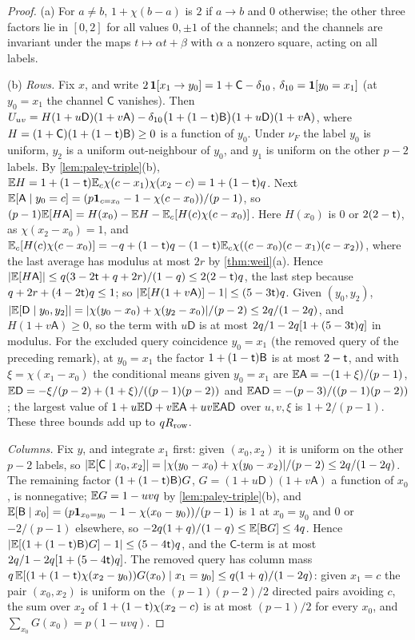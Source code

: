 \begin{proof}
(a) For $a\ne b$, $1+\chi(b-a)$ is $2$ if $a\to b$ and $0$ otherwise; the other
three factors lie in $[0,2]$ for all values $0,\pm1$ of the channels; and the
channels are invariant under the maps $t\mapsto\alpha t+\beta$ with $\alpha$ a
nonzero square, acting on all labels.

(b) \emph{Rows.} Fix $x$, and write $2\,\mathbf 1[x_1\to y_0]=1+\mathsf C-\delta_{10}$,
$\delta_{10}=\mathbf 1[y_0=x_1]$ (at $y_0=x_1$ the channel $\mathsf C$ vanishes). Then
$U_{uv}=H(1+u\mathsf D)(1+v\mathsf A)-\delta_{10}\bigl(1+(1-\mathsf t)\mathsf B\bigr)
(1+u\mathsf D)(1+v\mathsf A)$, where $H=(1+\mathsf C)(1+(1-\mathsf t)\mathsf B)\ge0$ is a
function of $y_0$. Under $\nu_F$ the label $y_0$ is uniform, $y_2$ is a uniform
out-neighbour of $y_0$, and $y_1$ is uniform on the other $p-2$ labels. By
\cref{lem:paley-triple}(b), $\mathbb E H=1+(1-\mathsf t)\mathbb E_c\chi(c-x_1)\chi(x_2-c)=
1+(1-\mathsf t)q$. Next $\mathbb E[\mathsf A\mid y_0=c]=(p\mathbf 1_{c=x_0}-1-\chi(c-x_0))/(p-1)$,
so $(p-1)\mathbb E[H\mathsf A]=H(x_0)-\mathbb E H-\mathbb E_c[H(c)\chi(c-x_0)]$. Here $H(x_0)$ is $0$
or $2(2-\mathsf t)$, as $\chi(x_2-x_0)=1$, and
$\mathbb E_c[H(c)\chi(c-x_0)]=-q+(1-\mathsf t)q-(1-\mathsf t)\mathbb E_c\chi((c-x_0)(c-x_1)(c-x_2))$,
where the last average has modulus at most $2r$ by \cref{thm:weil}(a). Hence
$|\mathbb E[H\mathsf A]|\le q(3-2\mathsf t+q+2r)/(1-q)\le2(2-\mathsf t)q$, the last step because
$q+2r+(4-2\mathsf t)q\le1$; so $|\mathbb E[H(1+v\mathsf A)]-1|\le(5-3\mathsf t)q$. Given
$(y_0,y_2)$, $|\mathbb E[\mathsf D\mid y_0,y_2]|=|\chi(y_0-x_0)+\chi(y_2-x_0)|/(p-2)\le
2q/(1-2q)$, and $H(1+v\mathsf A)\ge0$, so the term with $u\mathsf D$ is at most
$2q/1-2q[1+(5-3\mathsf t)q]$ in modulus. For the excluded
query coincidence $y_0=x_1$ (the removed query of the preceding
remark), at $y_0=x_1$
the factor $1+(1-\mathsf t)\mathsf B$ is at most $2-\mathsf t$, and with
$\xi=\chi(x_1-x_0)$ the conditional means given $y_0=x_1$ are
$\mathbb E\mathsf A=-(1+\xi)/(p-1)$,
$\mathbb E\mathsf D=-\xi/(p-2)+(1+\xi)/((p-1)(p-2))$ and
$\mathbb E\mathsf A\mathsf D=-(p-3)/((p-1)(p-2))$; the largest value of
$1+u\mathbb E\mathsf D+v\mathbb E\mathsf A+uv\mathbb E\mathsf A\mathsf D$ over $u,v,\xi$ is $1+2/(p-1)$.
These three bounds add up to $qR_{\rm row}$.

\emph{Columns.} Fix $y$, and integrate $x_1$ first: given $(x_0,x_2)$ it is
uniform on the other $p-2$ labels, so
$|\mathbb E[\mathsf C\mid x_0,x_2]|=|\chi(y_0-x_0)+\chi(y_0-x_2)|/(p-2)\le2q/(1-2q)$. The
remaining factor $(1+(1-\mathsf t)\mathsf B)G$, $G=(1+u\mathsf D)(1+v\mathsf A)$ a function
of $x_0$, is nonnegative; $\mathbb E G=1-uvq$ by \cref{lem:paley-triple}(b), and
$\mathbb E[\mathsf B\mid x_0]=(p\mathbf 1_{x_0=y_0}-1-\chi(x_0-y_0))/(p-1)$ is $1$ at
$x_0=y_0$ and $0$ or $-2/(p-1)$ elsewhere, so
$-2q(1+q)/(1-q)\le\mathbb E[\mathsf BG]\le4q$. Hence
$|\mathbb E[(1+(1-\mathsf t)\mathsf B)G]-1|\le(5-4\mathsf t)q$, and the $\mathsf C$-term is at most
$2q/1-2q[1+(5-4\mathsf t)q]$. The removed query has column mass
$q\,\mathbb E[(1+(1-\mathsf t)\chi(x_2-y_0))G(x_0)\mid x_1=y_0]\le q(1+q)/(1-2q)$: given
$x_1=c$ the pair $(x_0,x_2)$ is uniform on the $(p-1)(p-2)/2$ directed pairs
avoiding $c$, the sum over $x_2$ of $1+(1-\mathsf t)\chi(x_2-c)$ is at most
$(p-1)/2$ for every $x_0$, and $\sum_{x_0}G(x_0)=p(1-uvq)$.


\end{proof}
